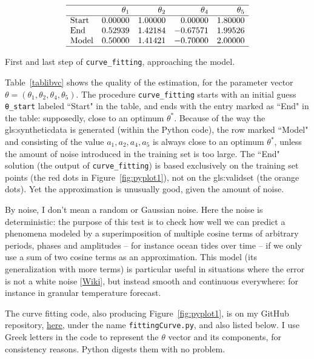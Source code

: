 \documentclass[oneside,10pt]{book}
\renewcommand{\arraystretch}{1.4} %
\begin{document}
\renewcommand{\arraystretch}{1.2} %
\begin{table}[H]
\[
\begin{array}{lrrrr}
\hline
   & \theta_1 & \theta_2  & \theta_4 & \theta_5  \\
\hline
\text{Start}	&	0.00000	&	1.00000	& 0.00000	 &  1.80000\\
\text{End}	&	0.52939	&	1.42184	&-0.67571	 &  1.99526\\
\text{Model}	&	0.50000	&	1.41421	& -0.70000	 & 2.00000  \\
\hline
\end{array}
\]
\caption{\label{tablibvc} First and last step of \texttt{curve\_fitting}, approaching the model.}
\end{table}
\renewcommand{\arraystretch}{1.0} %

Table~\ref{tablibvc} shows the quality of the estimation, for the parameter vector $\theta=(\theta_1,\theta_2,\theta_4,\theta_5)$.
The procedure \texttt{curve\_fitting} starts with an initial guess \texttt{\textcolor{gray2}{θ}\_start} labeled ``Start" in the table, and
 ends  with the entry marked as ``End" in the table: supposedly, close to an optimum $\theta^*$. Because of the way the
\gls{gls:syntheticdata} is generated (within the Python code), the row marked ``Model" and consisting of the value
 $a_1,a_2,a_4,a_5$ is always close to an optimum $\theta^*$,
 unless the amount of noise introduced in the training set is too large. The ``End" solution (the output of
 \texttt{curve\_fitting}) is based exclusively on the training set points (the red dots
 in Figure~\ref{fig:pyplot1}), not on the \gls{gls:validset} (the orange dots). Yet the approximation is unusually good, given the amount of noise.

 By noise, I don't mean a random or Gaussian noise. Here the noise is deterministic: the purpose of this test is to check how well we can predict a phenomena modeled by a superimposition of multiple cosine terms of arbitrary periods, phases and amplitudes -- for instance ocean tides over time -- if we only use a sum of two cosine terms as an approximation. This model (its generalization with more terms)  is particular useful in situations where the error is not a \textcolor{index}{white noise} [\href{https://en.wikipedia.org/wiki/White_noise}{Wiki}], but instead smooth and continuous everywhere: for instance in granular temperature forecast.

The curve fitting code, also producing Figure~\ref{fig:pyplot1}, is on my GitHub repository,
 \href{https://github.com/VincentGranville/Machine-Learning/blob/main/Source\%20Code/fittingCurve.py}{here},
 under the name \texttt{fittingCurve.py}, and also listed below. I use Greek letters in the code  to represent the $\theta$ vector and its
 components, for consistency reasons. Python digests them with no problem.  \\
\end{document}

